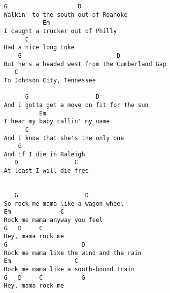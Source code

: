 \documentclass[leqno]{memoir}
\begin{document}
\begin{verbatim}
G                    D
Walkin' to the south out of Roanoke
           Em
I caught a trucker out of Philly
      C
Had a nice long toke
    G                           D
But he's a headed west from the Cumberland Gap
   C
To Johnson City, Tennessee

      G                   D
And I gotta get a move on fit for the sun
          Em
I hear my baby callin' my name
      C
And I know that she's the only one
    G
And if I die in Raleigh
   D                C
At least I will die free


   G                   D
So rock me mama like a wagon wheel
Em              C
Rock me mama anyway you feel
G   D     C
Hey, mama rock me
G                     D
Rock me mama like the wind and the rain
Em                  C
Rock me mama like a south-bound train
G   D     C           G
Hey, mama rock me
\end{verbatim}
\newpage
\end{document}
